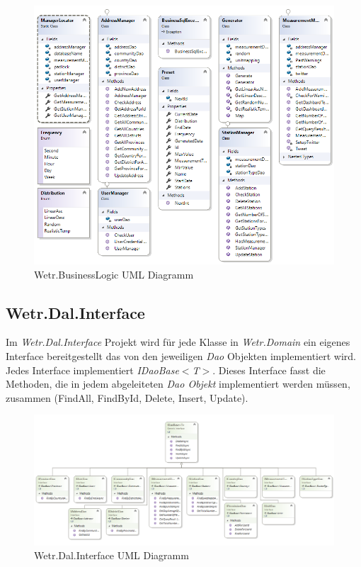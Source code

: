 \begin{figure}[H]
\centering
\includegraphics[width=\textwidth]{pictures/BusinessLogic.png}
\caption{Wetr.BusinessLogic UML Diagramm}
\label{fig:Wetr.BusinessLogic}
\end{figure}
\raggedright

\newpage
\subsection{Wetr.Dal.Interface}
Im \textit{Wetr.Dal.Interface} Projekt wird für jede Klasse in  \textit{Wetr.Domain} ein eigenes Interface bereitgestellt das von den jeweiligen \textit{Dao} Objekten implementiert wird. Jedes Interface implementiert \textit{IDaoBase}$<$\textit{T}$>$. Dieses Interface fasst die Methoden, die in jedem abgeleiteten \textit{Dao Objekt} implementiert werden müssen, zusammen (FindAll, FindById, Delete, Insert, Update).

\begin{figure}[H]
\centering
\includegraphics[width=\textwidth]{pictures/Wetr_Dal_Interface.png}
\caption{Wetr.Dal.Interface UML Diagramm}
\label{fig:Wetr.Dal.Interface}
\end{figure}
\raggedright

